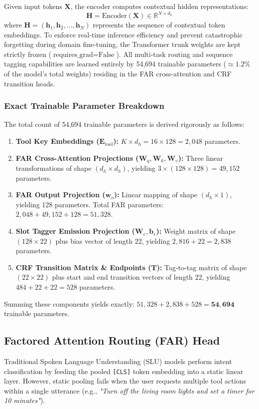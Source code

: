 \documentclass[letterpaper]{article} %
\begin{document}
Given input tokens $\mathbf{X}$, the encoder computes contextual hidden representations:
\begin{equation}
    \mathbf{H} = \text{Encoder}(\mathbf{X}) \in \mathbb{R}^{N \times d_h}
\end{equation}
where $\mathbf{H}=(\mathbf{h}_1,\mathbf{h}_2, \dots , \mathbf{h}_N)$ represents the sequence of contextual token embeddings. To enforce real-time inference efficiency and prevent catastrophic forgetting during domain fine-tuning, the Transformer trunk weights are kept strictly frozen ($\text{requires\_grad}=\text{False}$). All multi-task routing and sequence tagging capabilities are learned entirely by 54,694 trainable parameters ($\approx 1.2\%$ of the model's total weights) residing in the FAR cross-attention and CRF transition heads.

\subsubsection{Exact Trainable Parameter Breakdown}
The total count of 54,694 trainable parameters is derived rigorously as follows:
\begin{enumerate}
    \item \textbf{Tool Key Embeddings ($\mathbf{E}_{\text{tool}}$):} $K \times d_h = 16 \times 128 = 2,048$ parameters.
    \item \textbf{FAR Cross-Attention Projections ($\mathbf{W}_q, \mathbf{W}_k, \mathbf{W}_v$):} Three linear transformations of shape $(d_h \times d_h)$, yielding $3 \times (128 \times 128) = 49,152$ parameters.
    \item \textbf{FAR Output Projection ($\mathbf{w}_o$):} Linear mapping of shape $(d_h \times 1)$, yielding 128 parameters. Total FAR parameters: $2,048 + 49,152 + 128 = 51,328$.
    \item \textbf{Slot Tagger Emission Projection ($\mathbf{W}_e, \mathbf{b}_e$):} Weight matrix of shape $(128 \times 22)$ plus bias vector of length 22, yielding $2,816 + 22 = 2,838$ parameters.
    \item \textbf{CRF Transition Matrix \& Endpoints ($\mathbf{T}$):} Tag-to-tag matrix of shape $(22 \times 22)$ plus start and end transition vectors of length 22, yielding $484 + 22 + 22 = 528$ parameters.
\end{enumerate}
Summing these components yields exactly: $51,328 + 2,838 + 528 = \mathbf{54,694}$ trainable parameters.

\subsection{Factored Attention Routing (FAR) Head}
Traditional Spoken Language Understanding (SLU) models perform intent classification by feeding the pooled \texttt{[CLS]} token embedding into a static linear layer. However, static pooling fails when the user requests multiple tool actions within a single utterance (e.g., \emph{"Turn off the living room lights and set a timer for 10 minutes"}).
\end{document}
